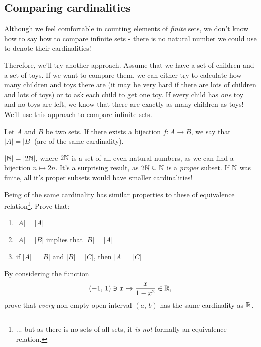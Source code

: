 \subsection{Comparing cardinalities}
Although we feel comfortable in counting elements of \textit{finite} sets, we don't know how to say how to compare infinite sets - there is no natural number we could use to denote
their cardinalities!

Therefore, we'll try another approach. Assume that we have a set of children and a set of toys. If we want to compare them, we can either try to calculate how many children and toys there are (it may be very hard if there are lots of children and lots of toys) or to ask each child to get one toy. If every child has \textit{one} toy and no toys are left, we know
that there are exactly as many children as toys! We'll use this approach to compare infinite sets.

\begin{definition}
  Let $A$ and $B$ be two sets. If there exists a bijection $f:A\to B$, we say that $|A|=|B|$ (are of the same cardinality).
\end{definition}

\begin{example}
  $|\mathbb N|=|2\mathbb N|$, where $2\mathbb N$ is a set of all even natural numbers, as we can find a bijection $n\mapsto 2n$. It's a surprising result, as $2\mathbb N\subseteq \mathbb N$ is a \textit{proper} subset. If $\mathbb N$ was finite, all it's proper subsets would have smaller cardinalities!
\end{example}

\begin{exercise}
  Being of the same cardinality has similar properties to these of equivalence relation\footnote{... but as there is no sets of all sets, it \emph{is not} formally an equivalence relation.}. Prove that:
  \begin{enumerate}
    \item $|A|=|A|$
    \item $|A|=|B|$ implies that $|B|=|A|$ 
    \item if $|A|=|B|$ and $|B|=|C|$, then $|A|=|C|$ 
  \end{enumerate}
\end{exercise}

\begin{exercise}
  By considering the function
  $$(-1,\,1) \ni x \mapsto \frac{x}{1-x^2}\in \mathbb R,$$
  prove that \emph{every} non-empty open interval $(a,\, b)$ has the same cardinality as $\mathbb R$. 
\end{exercise}

